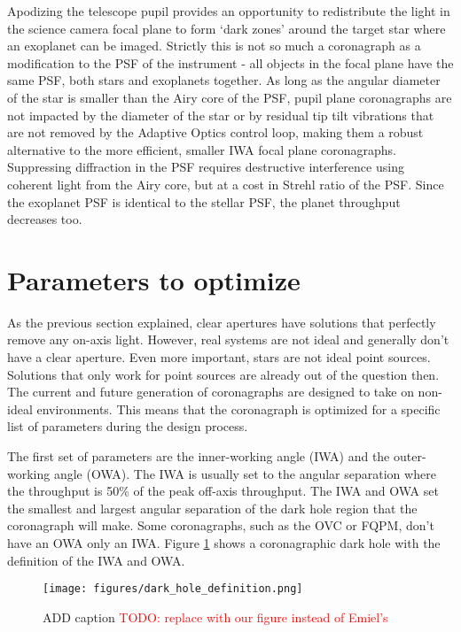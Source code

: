 \documentclass[letterpaper]{ar-1col}
\begin{document}
Apodizing the telescope pupil provides an opportunity to redistribute the light in the science camera focal plane to form `dark zones' around the target star where an exoplanet can be imaged.
%
Strictly this is not so much a coronagraph as a modification to the PSF of the instrument - all objects in the focal plane have the same PSF, both stars and exoplanets together.
%
As long as the angular diameter of the star is smaller than the Airy core of the PSF, pupil plane coronagraphs are not impacted by the diameter of the star or by residual tip tilt vibrations that are not removed by the Adaptive Optics control loop, making them a robust alternative to the more efficient, smaller IWA focal plane coronagraphs. 
%
Suppressing diffraction in the PSF requires destructive interference using coherent light from the Airy core, but at a cost in Strehl ratio of the PSF.
%
Since the exoplanet PSF is identical to the stellar PSF, the planet throughput decreases too.



\section{Parameters to optimize}

As the previous section explained, clear apertures have solutions that perfectly remove any on-axis light. However, real systems are not ideal and generally don't have a clear aperture. Even more important, stars are not ideal point sources. Solutions that only work for point sources are already out of the question then. The current and future generation of coronagraphs are designed to take on non-ideal environments. This means that the coronagraph is optimized for a specific list of parameters during the design process.

The first set of parameters are the inner-working angle (IWA) and the outer-working angle (OWA). The IWA is usually set to the angular separation where the throughput is 50\% of the peak off-axis throughput. The IWA and OWA set the smallest and largest angular separation of the dark hole region that the coronagraph will make. Some coronagraphs, such as the OVC or FQPM, don't have an OWA only an IWA. Figure \ref{fig:coronagraph_focal_plane_definitions} shows a coronagraphic dark hole with the definition of the IWA and OWA.

\begin{figure}[ht]
  \centering
  \texttt{[image: figures/dark\_hole\_definition.png]}
  \caption{ADD caption \textcolor{red}{TODO: replace with our figure instead of Emiel's}}
  \label{fig:coronagraph_focal_plane_definitions}
\end{figure}
\end{document}
